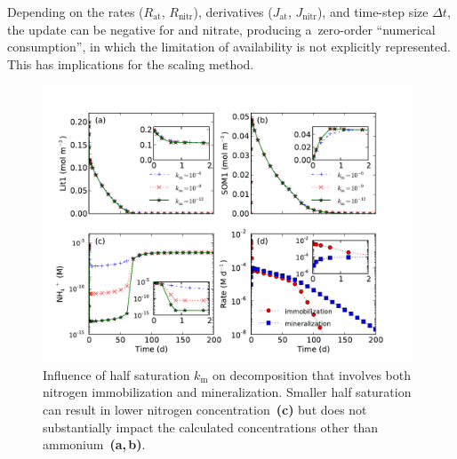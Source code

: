 \documentclass[gmd,noline]{copernicus}
\begin{document}
      Depending on the rates ($R_{\text{at}}$, $R_{\text{nitr}}$),
      derivatives ($J_{\text{at}}$, $J_{\text{nitr}}$), and time-step size
      $\Delta t$, the update can be negative for  and nitrate,
      producing a~zero-order ``numerical consumption'', in which the
      limitation of availability is not explicitly represented. This has
      implications for the scaling method.

\begin{figure}[t]
\includegraphics[width=110mm]{gmd-2015-254-f02.pdf}
\caption{Influence of half saturation $k_\mathrm{m}$ on decomposition that
involves both nitrogen immobilization and mineralization. Smaller half
saturation can result in lower nitrogen concentration~\textbf{(c)} but does
not substantially impact the calculated concentrations other than
ammonium~\textbf{(a,\,b)}.} \label{fig:decomp}
\end{figure}
\end{document}
